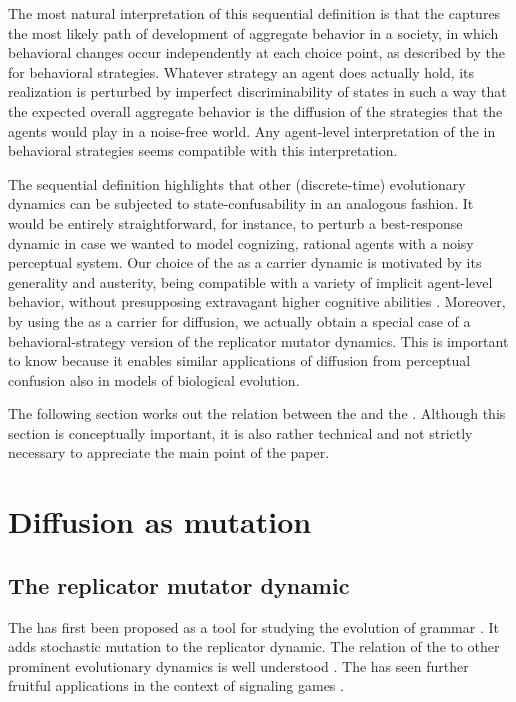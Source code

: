\documentclass[fleqn,reqno,10pt]{article}
\newcommand{\rd}{\acro{rd}} %
\newcommand{\rmd}{\acro{rmd}} %
\newcommand{\rdd}{\acro{rdd}} %
\begin{document}
The most natural interpretation of this sequential definition is that
the \rdd captures the most likely path of development of aggregate
behavior in a society, in which behavioral
changes occur independently at each choice point, as described by the
\rd for behavioral strategies. Whatever strategy an agent does
actually hold, its realization is perturbed by imperfect
discriminability of states in such a way that the expected overall
aggregate behavior is the diffusion of the strategies that the agents
would play in a noise-free world. Any agent-level interpretation of
the \rd in behavioral strategies seems compatible with this
interpretation.

The sequential definition highlights that other (discrete-time)
evolutionary dynamics can be subjected to state-confusability in an
analogous fashion. It would be entirely straightforward, for instance,
to perturb a best-response dynamic in case we wanted to model
cognizing, rational agents with a noisy perceptual system. Our choice
of the \rd as a carrier dynamic is motivated by its generality and
austerity, being compatible with a variety of implicit agent-level
behavior, without presupposing extravagant higher cognitive abilities
\citep[c.f.][]{Sandholm2013:Population-Game}. Moreover, by using the
\rd as a carrier for diffusion, we actually obtain a special case of a
behavioral-strategy version of the replicator mutator dynamics. This
is important to know because it enables similar applications of
diffusion from perceptual confusion also in models of biological
evolution.

The following section works out the relation between the \rdd and the \rmd.
Although this section is conceptually important, it is also rather
technical and not strictly necessary to appreciate the main point of
the paper.

\section{Diffusion as mutation}
\label{sec:diffusion-as-special}

\subsection{The replicator mutator dynamic}
\label{sec:repl-mutat-dynam}

The \rmd has first been proposed as a tool for studying the evolution
of grammar
\citep[e.g.][]{KomarovaNiyogi2001:The-Evolutionar,NowakKomarova2001:Evolution-of-Un}. It
adds stochastic mutation to the replicator dynamic. The relation of
the \rmd to other prominent evolutionary dynamics is well understood
\citep{PageNowak2002:Unifying-Evolut}. The \rmd has seen further
fruitful applications in the context of signaling games
\citep[e.g.][]{HutteggerSkyrms2010:Evolutionary-Dy}.
\end{document}
